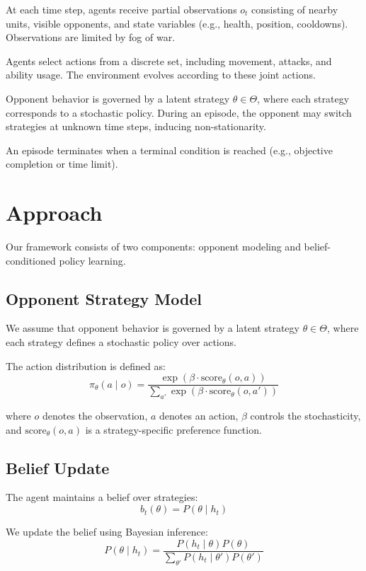 \documentclass{article}
\begin{document}
At each time step, agents receive partial observations $o_t$ consisting of nearby units, visible opponents, and state variables (e.g., health, position, cooldowns). Observations are limited by fog of war.

Agents select actions from a discrete set, including movement, attacks, and ability usage. The environment evolves according to these joint actions.

Opponent behavior is governed by a latent strategy $\theta \in \Theta$, where each strategy corresponds to a stochastic policy. During an episode, the opponent may switch strategies at unknown time steps, inducing non-stationarity.

An episode terminates when a terminal condition is reached (e.g., objective completion or time limit).


\section{Approach}

Our framework consists of two components: opponent modeling and belief-conditioned policy learning.

\subsection{Opponent Strategy Model}

We assume that opponent behavior is governed by a latent strategy $\theta \in \Theta$, where each strategy defines a stochastic policy over actions.

The action distribution is defined as:
\[
\pi_\theta(a \mid o) = \frac{\exp(\beta \cdot \text{score}_\theta(o,a))}{\sum_{a'} \exp(\beta \cdot \text{score}_\theta(o,a'))}
\]

where $o$ denotes the observation, $a$ denotes an action, $\beta$ controls the stochasticity, and $\text{score}_\theta(o,a)$ is a strategy-specific preference function.

\subsection{Belief Update}

The agent maintains a belief over strategies:
\[
b_t(\theta) = P(\theta \mid h_t)
\]

We update the belief using Bayesian inference:
\[
P(\theta \mid h_t) = \frac{P(h_t \mid \theta) P(\theta)}{\sum_{\theta'} P(h_t \mid \theta') P(\theta')}
\]
\end{document}
